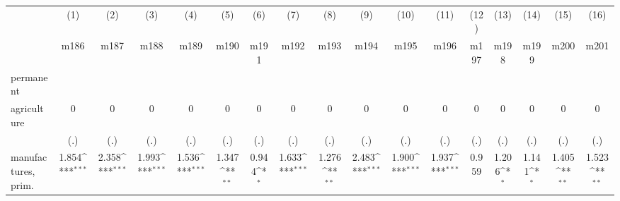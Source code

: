 {
\def\sym#1{\ifmmode^{#1}\else\(^{#1}\)\fi}
\begin{tabular}{l*{16}{c}}
\hline\hline
                    &\multicolumn{1}{c}{(1)}&\multicolumn{1}{c}{(2)}&\multicolumn{1}{c}{(3)}&\multicolumn{1}{c}{(4)}&\multicolumn{1}{c}{(5)}&\multicolumn{1}{c}{(6)}&\multicolumn{1}{c}{(7)}&\multicolumn{1}{c}{(8)}&\multicolumn{1}{c}{(9)}&\multicolumn{1}{c}{(10)}&\multicolumn{1}{c}{(11)}&\multicolumn{1}{c}{(12)}&\multicolumn{1}{c}{(13)}&\multicolumn{1}{c}{(14)}&\multicolumn{1}{c}{(15)}&\multicolumn{1}{c}{(16)}\\
                    &\multicolumn{1}{c}{m186}&\multicolumn{1}{c}{m187}&\multicolumn{1}{c}{m188}&\multicolumn{1}{c}{m189}&\multicolumn{1}{c}{m190}&\multicolumn{1}{c}{m191}&\multicolumn{1}{c}{m192}&\multicolumn{1}{c}{m193}&\multicolumn{1}{c}{m194}&\multicolumn{1}{c}{m195}&\multicolumn{1}{c}{m196}&\multicolumn{1}{c}{m197}&\multicolumn{1}{c}{m198}&\multicolumn{1}{c}{m199}&\multicolumn{1}{c}{m200}&\multicolumn{1}{c}{m201}\\
\hline
permanent           &                     &                     &                     &                     &                     &                     &                     &                     &                     &                     &                     &                     &                     &                     &                     &                     \\
agriculture         &           0         &           0         &           0         &           0         &           0         &           0         &           0         &           0         &           0         &           0         &           0         &           0         &           0         &           0         &           0         &           0         \\
                    &         (.)         &         (.)         &         (.)         &         (.)         &         (.)         &         (.)         &         (.)         &         (.)         &         (.)         &         (.)         &         (.)         &         (.)         &         (.)         &         (.)         &         (.)         &         (.)         \\
[1em]
manufactures, prim. &       1.854\sym{***}&       2.358\sym{***}&       1.993\sym{***}&       1.536\sym{***}&       1.347\sym{**} &       0.944\sym{*}  &       1.633\sym{***}&       1.276\sym{**} &       2.483\sym{***}&       1.900\sym{***}&       1.937\sym{***}&       0.959         &       1.206\sym{*}  &       1.141\sym{*}  &       1.405\sym{**} &       1.523\sym{**} \\

\end{tabular}}
